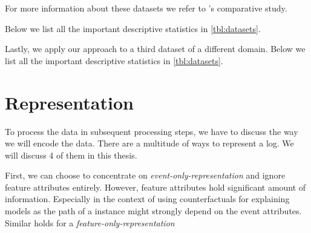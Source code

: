 \documentclass[./../../paper.tex]{subfiles}
\begin{document}
For more information about these datasets we refer to \citeauthor{teinemaa_OutcomeOrientedPredictiveProcess_2018a}'s comparative study\autocite{teinemaa_OutcomeOrientedPredictiveProcess_2018a}.

Below we list all the important descriptive statistics in \autoref{tbl:datasets}.  


Lastly, we apply our approach to a third dataset of a different domain. Below we list all the important descriptive statistics in \autoref{tbl:datasets}.  



\section{Representation}
\label{sec:representation}
To process the data in subsequent processing steps, we have to discuss the way we will encode the data. There are a multitude of ways to represent a log. We will discuss 4 of them in this thesis.

First, we can choose to concentrate on \emph{event-only-representation} and ignore feature attributes entirely. However, feature attributes hold significant amount of information. Especially in the context of using counterfactuals for explaining models as the path of a \gls{instance} might strongly depend on the event attributes. Similar holds for a \emph{feature-only-representation}
\end{document}
